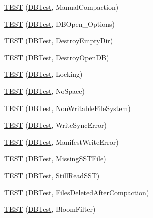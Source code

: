 \begin{DoxyCompactItemize}
\item 
\mbox{\hyperlink{namespaceleveldb_a34a511836c47efe81202280115290934}{T\+E\+ST}} (\mbox{\hyperlink{classleveldb_1_1_d_b_test}{D\+B\+Test}}, Manual\+Compaction)
\item 
\mbox{\hyperlink{namespaceleveldb_a88d6fdcb16ed4edc65da40f383e6f23b}{T\+E\+ST}} (\mbox{\hyperlink{classleveldb_1_1_d_b_test}{D\+B\+Test}}, D\+B\+Open\+\_\+\+Options)
\item 
\mbox{\hyperlink{namespaceleveldb_a63ad7fa22ccda6c82e41ab295482b8ba}{T\+E\+ST}} (\mbox{\hyperlink{classleveldb_1_1_d_b_test}{D\+B\+Test}}, Destroy\+Empty\+Dir)
\item 
\mbox{\hyperlink{namespaceleveldb_a8e64ab3b4178a875b558d28409764e7f}{T\+E\+ST}} (\mbox{\hyperlink{classleveldb_1_1_d_b_test}{D\+B\+Test}}, Destroy\+Open\+DB)
\item 
\mbox{\hyperlink{namespaceleveldb_a8470163c7e8b292085a5b60f989dc828}{T\+E\+ST}} (\mbox{\hyperlink{classleveldb_1_1_d_b_test}{D\+B\+Test}}, Locking)
\item 
\mbox{\hyperlink{namespaceleveldb_a11f56de4abca34391c0e60f311262b65}{T\+E\+ST}} (\mbox{\hyperlink{classleveldb_1_1_d_b_test}{D\+B\+Test}}, No\+Space)
\item 
\mbox{\hyperlink{namespaceleveldb_a9d69b380c464519a1b946fb1faa21cbd}{T\+E\+ST}} (\mbox{\hyperlink{classleveldb_1_1_d_b_test}{D\+B\+Test}}, Non\+Writable\+File\+System)
\item 
\mbox{\hyperlink{namespaceleveldb_ab30f3608fe480a765f28f713415b7fe4}{T\+E\+ST}} (\mbox{\hyperlink{classleveldb_1_1_d_b_test}{D\+B\+Test}}, Write\+Sync\+Error)
\item 
\mbox{\hyperlink{namespaceleveldb_a071c4940c40a4eed0d3e4e4044a227a6}{T\+E\+ST}} (\mbox{\hyperlink{classleveldb_1_1_d_b_test}{D\+B\+Test}}, Manifest\+Write\+Error)
\item 
\mbox{\hyperlink{namespaceleveldb_a8e750f4502e214132281fd755d26c175}{T\+E\+ST}} (\mbox{\hyperlink{classleveldb_1_1_d_b_test}{D\+B\+Test}}, Missing\+S\+S\+T\+File)
\item 
\mbox{\hyperlink{namespaceleveldb_ab4a8284a6c982c710e6e84af0d6040a9}{T\+E\+ST}} (\mbox{\hyperlink{classleveldb_1_1_d_b_test}{D\+B\+Test}}, Still\+Read\+S\+ST)
\item 
\mbox{\hyperlink{namespaceleveldb_a47755684dc15db851e0174ea9475e97c}{T\+E\+ST}} (\mbox{\hyperlink{classleveldb_1_1_d_b_test}{D\+B\+Test}}, Files\+Deleted\+After\+Compaction)
\item 
\mbox{\hyperlink{namespaceleveldb_a6d54978f51e046c170696cbb320f23f1}{T\+E\+ST}} (\mbox{\hyperlink{classleveldb_1_1_d_b_test}{D\+B\+Test}}, Bloom\+Filter)

\end{DoxyCompactItemize}
